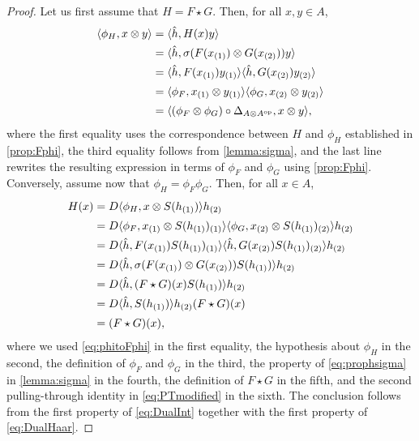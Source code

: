 \documentclass[a4paper,10pt]{amsart}
\newcommand{\eval}[2]{\langle #1 , #2\rangle}
\theoremstyle{definition}
\begin{document}
\begin{proof}
	Let us first assume that $H = F\star G$. Then, for all $x,y\in A$,
	\begin{align}
		\eval{\phi_H}{x \otimes y}
		  & =
		\eval{ \hat{h} }{ H(x) y}
		\\
		  & =
		\eval{ \hat{h} }{\sigma(F(x_{(1)}) \otimes G(x_{(2)})) y }
		\\
		  & =
		\eval{ \hat{h} }{ F(x_{(1)}) y_{(1)} }
		\eval{ \hat{h} }{ G(x_{(2)}) y_{(2)} }
		\\
		  & =
		\eval{ \phi_F}{ x_{(1)} \otimes y_{(1)}}
            \eval{\phi_G }{x_{(2)} \otimes y_{(2)} }
                \vphantom{\hat{h}} %
		\\
		  & =
        \eval{ (\phi_F \otimes \phi_G) \circ \Delta_{A\otimes A^{\mathrm{op}}} }{ x \otimes y },
            \vphantom{\hat{h}} %
	\end{align}
    where the first equality uses the correspondence between $H$ and $\phi_H$ established in \cref{prop:Fphi}, the third equality follows from \cref{lemma:sigma}, and the last line rewrites the resulting expression in terms of $\phi_F$ and $\phi_G$ using \cref{prop:Fphi}.
    \smallbreak\noindent%
    Conversely, assume now that $\phi_H = \phi_F \phi_G$. Then, for all $x\in A$,
	\begin{align}
		H(x)
		  & =
    		D
            \eval{\phi_H}{x\otimes S(h_{(1)})}
            h_{(2)}
            \vphantom{\hat{h}}
    		\\
        & =
    		D
            \eval{\phi_F}{x_{(1)}\otimes S(h_{(1)})_{(1)}}
            \eval{\phi_G}{x_{(2)}\otimes S(h_{(1)})_{(2)}} 
            h_{(2)}
            \vphantom{\hat{h}}
    		\\
		  & =
    		D
            \eval{\hat{h}}{ F(x_{(1)})S(h_{(1)})_{(1)} }
            \eval{\hat{h}}{G(x_{(2)})S(h_{(1)})_{(2)}}
            h_{(2)}
    		\\
		  & =
    		D
            \eval{\hat{h}}{\sigma(F(x_{(1)}) \otimes G(x_{(2)})) S(h_{(1)})}
            h_{(2)}
    		\\
        & =
    		D
            \eval{\hat{h}}{(F\star G)(x) S(h_{(1)})}
            h_{(2)}
    		\\
        & =
    		D
            \eval{\hat{h}}{ S(h_{(1)})}
            h_{(2)} (F\star G)(x)
    		\\
		  & =
		      (F\star G)(x) \vphantom{\hat{h}},
	\end{align}
	where we used \cref{eq:phitoFphi} in the first equality,
    the hypothesis about $\phi_H$ in the second, the definition of $\phi_F$ and $\phi_G$ in the third, the property of \cref{eq:prophsigma} in \cref{lemma:sigma} in the fourth,
    the definition of $F\star G$ in the fifth, and the second pulling-through identity in \cref{eq:PTmodified} in the sixth. The conclusion follows from the first property of \cref{eq:DualInt} together with the first property of \cref{eq:DualHaar}.
\end{proof}
\end{document}
